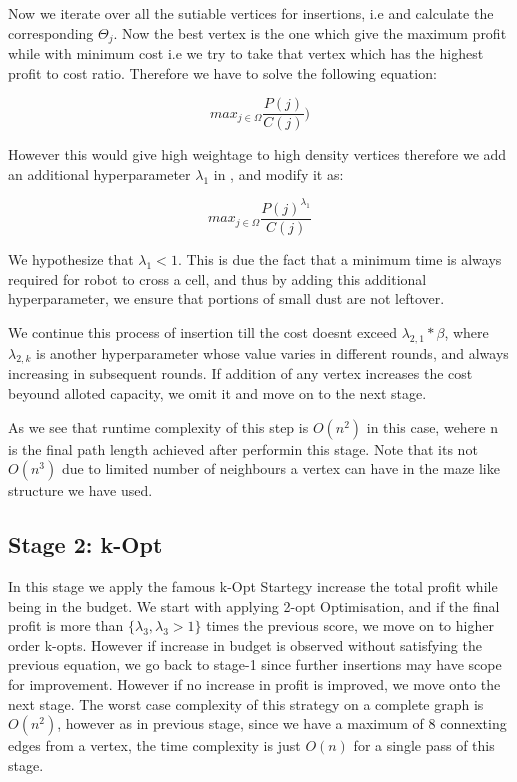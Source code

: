 \documentclass{article}
\begin{document}
Now we iterate over all the sutiable vertices for insertions, i.e and calculate the corresponding
$\Theta_{j}$. Now the best vertex is the one which give the maximum profit while with minimum cost i.e we try to take that vertex which has the highest profit to cost ratio.
Therefore we have to solve the following equation:

\begin{equation} \label{eq3}
    max_{j \in \Omega} \frac{P(j)}{C(j)} )
\end{equation}

However this would give high weightage to high density vertices therefore we add an additional hyperparameter $\lambda_1$ in ,
and modify it as:

\begin{equation} \label{eq4}
    max_{j \in \Omega}  \frac{P(j)^{\lambda_{1}}}{C(j)}
\end{equation}

We hypothesize that $\lambda_{1} < 1$. This is due the fact that a minimum time is always required for robot to cross a cell, and thus by adding this additional hyperparameter,
we ensure that portions of small dust are not leftover.

We continue this process of insertion till the cost doesnt exceed $\lambda_{2,1} * \beta$, where $\lambda_{2,k}$ is another hyperparameter whose value varies in different rounds, and always increasing in subsequent rounds. 
If addition of any vertex increases the cost beyound alloted capacity, we omit it and move on to the next stage.

As we see that runtime complexity of this step is $O(n^2)$ in this case, wehere n is the final path length achieved after performin this stage. Note that its not $O(n^3)$ due to limited number of neighbours a vertex can have in the maze like structure we have used.


\subsection{Stage 2: k-Opt}
\label{kopt}
In this stage we apply the famous k-Opt Startegy \cite{opt1} \cite{opt2} increase the total profit while being in the budget. 
We start with applying 2-opt Optimisation, and if the final profit is more than $\{ \lambda_{3} , \lambda_{3} > 1 \}$ times the previous score, we move on to higher order k-opts. 
However if increase in budget is observed without satisfying the previous equation, we go back to stage-1 since further insertions may have scope for improvement. 
However if no increase in profit is improved, we move onto the next stage. The worst case complexity of this strategy on a complete graph is $O(n^2)$, however as in previous stage, since we have a maximum of 8 connexting edges from a vertex, the time complexity is just $O(n)$ for a single pass of this stage.
\end{document}
